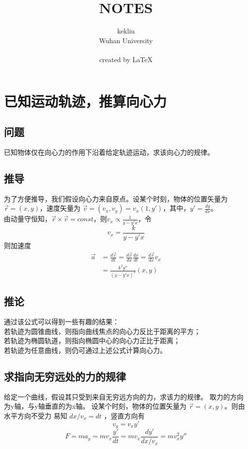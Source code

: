 \documentclass{ctexart}
\title{NOTES}
\author{kekliu\\Wuhan University\\\\created by \LaTeX}
\begin{document}
	
	\maketitle
	\thispagestyle{empty}
	\pagebreak
	
	\tableofcontents
	\thispagestyle{empty}
	\pagebreak
	
	\setcounter{page}{1}
	
	
	
	
	\section{已知运动轨迹，推算向心力}
	\subsection{问题}
	已知物体仅在向心力的作用下沿着给定轨迹运动，求该向心力的规律。
	\subsection{推导}
	为了方便推导，我们假设向心力来自原点。设某个时刻，物体的位置矢量为 $ \vec{r} =(x,y) $，速度矢量为 $ \vec{v}=(v_x,v_y)=v_x (1,y') $，其中，$ y'=\frac{dy}{dx} $。
	\\
	由动量守恒知，$ \vec{r}\times\vec{v}=const $，则$ v_x\propto\frac{1}{y-y'x} $，令
	\begin{equation} v_x=\frac{k}{y-y'x} \end{equation}
	则加速度
	\begin{equation}
	\begin{split}
	\vec{a} &= \frac{d\vec{v}}{dt} = \frac{d\vec{v}}{dx} \frac{dx}{dt} = \frac{d\vec{v}}{dx} v_x \\
	&= \frac{k^2 y''}{(y-y'x)^3} (x,y)
	\end{split}
	\end{equation}
	\subsection{推论}
	\noindent
	通过该公式可以得到一些有趣的结果：
	\\若轨迹为圆锥曲线，则指向曲线焦点的向心力反比于距离的平方；
	\\若轨迹为椭圆轨道，则指向椭圆中心的向心力正比于距离；
	\\若轨迹为任意曲线，则仍可通过上述公式计算向心力。
	\subsection{求指向无穷远处的力的规律}
	给定一个曲线，假设其只受到来自无穷远方向的力，求该力的规律。
	取力的方向为y轴，与y轴垂直的为x轴。
	设某个时刻，物体的位置矢量为 $ \vec{r} =(x,y) $。则由水平方向不受力
	易知 $dx / v_x = dt$ ，竖直方向有
	\begin{equation}
	v_y = v_x y'
	\end{equation}
	\begin{equation}
	F = m a_y = m v_x \frac{y'}{dt} = m v_x \frac{dy'}{dx / v_x} = m v_x^2 y''
	\end{equation}
\end{document}
